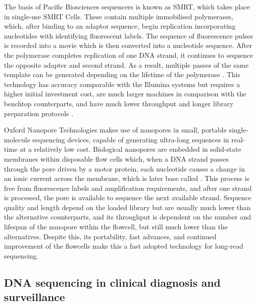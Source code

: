 The basis of Pacific Biosciences sequencers is known as \ac{SMRT}, which takes place in single-use \ac{SMRT} Cells. 
These contain multiple immobilised polymerases, which, after binding to an adaptor sequence, begin replication incorporating nucleotides with identifying fluorescent labels. 
The sequence of fluorescence pulses is recorded into a movie which is then converted into a nucleotide sequence. 
After the polymerase completes replication of one \ac{DNA} strand, it continues to sequence the opposite adapter and second strand. 
As a result, multiple passes of the same template can be generated depending on the lifetime of the polymerase \citep{hoang_long-reads-based_2022, loman_twenty_2015}. 
This technology has accuracy comparable with the Illumina systems but requires a higher initial investment cost, are much larger machines in comparison with the benchtop counterparts, and have much lower throughput and longer library preparation protocols \citep{hoang_long-reads-based_2022, wenger_accurate_2019}. 

Oxford Nanopore Technologies makes use of nanopores in small, portable single-molecule sequencing devices, capable of generating ultra-long sequences in real-time at a relatively low cost. 
Biological nanopores are embedded in solid-state membranes within disposable flow cells which, when a \ac{DNA} strand passes through the pore driven by a motor protein, each nucleotide causes a change in an ionic current across the membrane, which is later base called \citep{hoang_long-reads-based_2022, loman_twenty_2015}. 
This process is free from fluorescence labels and amplification requirements, and after one strand is processed, the pore is available to sequence the next available strand. 
Sequence quality and length depend on the loaded library but are usually much lower than the alternative counterparts, and its throughput is dependent on the number and lifespan of the nanopore within the flowcell, but still much lower than the alternatives. 
Despite this, its portability, fast advances, and continued improvement of the flowcells make this a fast adopted technology for long-read sequencing.  

\subsection{DNA sequencing in clinical diagnosis and surveillance} \label{ssec:_intro_sequencing_diagnosis}

